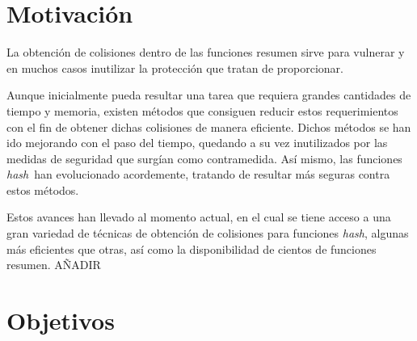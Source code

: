 \documentclass[12pt,spanish,listoffigures,listoftables,listofalgorithms]{tfgetsinf}
\newcommand{\hash}{\textit{hash}}
\begin{document}
\section{Motivaci\'on}

%
%

La obtención de colisiones dentro de las funciones resumen sirve para vulnerar y en muchos casos inutilizar la protección que tratan de proporcionar.

Aunque inicialmente pueda resultar una tarea que requiera grandes cantidades de tiempo y memoria, existen métodos que consiguen reducir estos requerimientos con el fin de obtener dichas colisiones de manera eficiente. Dichos métodos se han ido mejorando con el paso del tiempo, quedando a su vez inutilizados por las medidas de seguridad que surgían como contramedida. Así mismo, las funciones \hash~han evolucionado acordemente, tratando de resultar más seguras contra estos métodos.

Estos avances han llevado al momento actual, en el cual se tiene acceso a una gran variedad de técnicas de obtención de colisiones para funciones \hash, algunas más eficientes que otras, así como la disponibilidad de cientos de funciones resumen. AÑADIR

\section{Objetivos}
\end{document}
